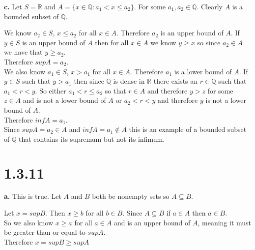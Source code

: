 \documentclass{article}
\begin{document}
{\Large \textbf{c.}} Let $S = \mathbb{R}$ and $A = \{x\in\mathbb{Q} : a_1 < x \leq a_2\}$. For some $a_1, a_2\in\mathbb{Q}$. Clearly $A$ is a bounded subset of $\mathbb{Q}$.
\begin{center}
    \doublespacing
    We know $a_2\in S$, $x\leq a_2$ for all $x\in A$. Therefore $a_2$ is an upper bound of $A$. If $y\in S$ is an upper bound of $A$ then for all $x\in A$ we know $y\geq x$ so since $a_2\in A$ we have that $y\geq a_2$.
    \\Therefore $sup A = a_2$.
    \\We also know $a_1\in S$, $x > a_1$ for all $x\in A$. Therefore $a_1$ is a lower bound of $A$. If $y\in S$ such that $y > a_1$ then since $\mathbb{Q}$ is dense in $\mathbb{R}$ there exists an $r\in\mathbb{Q}$ such that $a_1 < r < y$. So either $a_1 < r\leq a_2$ so that $r\in A$ and therefore $y > z$ for some $z\in A$ and is not a lower bound of $A$ or $a_2 < r < y$ and therefore $y$ is not a lower bound of $A$.
    \\Therefore $inf A = a_1$.
    \\Since $sup A = a_2\in A$ and $inf A = a_1\notin A$ this is an example of a bounded subset of $\mathbb{Q}$ that contains its supremum but not its infimum.
\end{center}




\newpage
\section*{1.3.11}

{\Large \textbf{a.}} This is true. Let $A$ and $B$ both be nonempty sets so $A\subseteq B$.
\begin{center}
    \doublespacing
        Let $x = sup B$. Then $x\geq b$ for all $b\in B$. Since $A\subseteq B$ if $a\in A$ then $a\in B$.
        \\So we also know $x\geq a$ for all $a\in A$ and is an upper bound of $A$, meaning it must be greater than or equal to $sup A$.
        \\Therefore $x = sup B\geq sup A$ \qedsymbol
\end{center}
\end{document}
